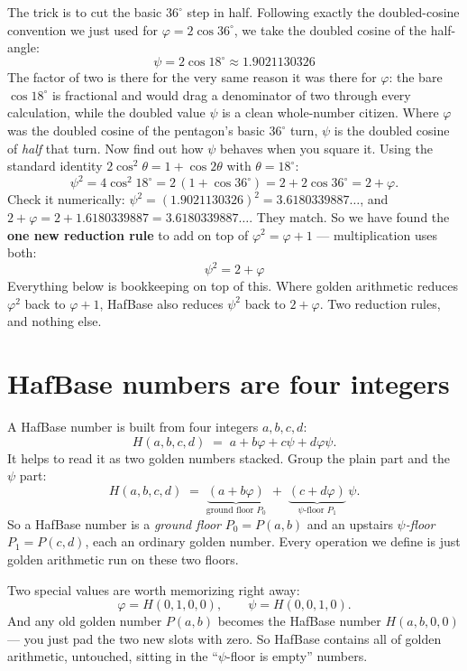\documentclass[11pt]{article}
\newcommand{\phigr}{\varphi}
\newcommand{\Hn}[4]{H(#1,#2,#3,#4)}
\newcommand{\Pn}[2]{P(#1,#2)}
\begin{document}
The trick is to cut the basic $36^\circ$ step in half. Following exactly the doubled-cosine convention
we just used for $\phigr = 2\cos 36^\circ$, we take the doubled cosine of the half-angle:
\[
\boxed{\;\psi = 2\cos 18^\circ \approx 1.9021130326\;}
\]
The factor of two is there for the very same reason it was there for $\phigr$: the bare $\cos 18^\circ$ is
fractional and would drag a denominator of two through every calculation, while the doubled value $\psi$
is a clean whole-number citizen. Where $\phigr$ was the doubled cosine of the pentagon's basic $36^\circ$
turn, $\psi$ is the doubled cosine of \emph{half} that turn. Now find out how $\psi$ behaves when you
square it. Using the standard identity $2\cos^2\theta = 1 + \cos 2\theta$ with $\theta = 18^\circ$:
\[
\psi^2 = 4\cos^2 18^\circ = 2\,(1 + \cos 36^\circ) = 2 + 2\cos 36^\circ = 2 + \phigr.
\]
Check it numerically: $\psi^2 = (1.9021130326)^2 = 3.6180339887\ldots$, and $2 + \phigr = 2 + 1.6180339887 =
3.6180339887\ldots$. They match. So we have found the \textbf{one new reduction rule} to add on top of
$\phigr^2 = \phigr + 1$ --- multiplication uses both:
\[
\boxed{\;\psi^2 = 2 + \phigr\;}
\]
Everything below is bookkeeping on top of this. Where golden arithmetic reduces $\phigr^2$ back to
$\phigr + 1$, HafBase also reduces $\psi^2$ back to $2 + \phigr$. Two reduction rules, and nothing else.

\section{HafBase numbers are four integers}

A HafBase number is built from four integers $a, b, c, d$:
\[
\Hn{a}{b}{c}{d} \;=\; a + b\phigr + c\psi + d\phigr\psi.
\]
It helps to read it as two golden numbers stacked. Group the plain part and the $\psi$ part:
\[
\Hn{a}{b}{c}{d} \;=\; \underbrace{(a + b\phigr)}_{\text{ground floor } P_0} \;+\;
\underbrace{(c + d\phigr)}_{\psi\text{-floor } P_1}\,\psi .
\]
So a HafBase number is a \emph{ground floor} $P_0 = \Pn{a}{b}$ and an upstairs \emph{$\psi$-floor}
$P_1 = \Pn{c}{d}$, each an ordinary golden number. Every operation we define is just golden
arithmetic run on these two floors.

Two special values are worth memorizing right away:
\[
\phigr = \Hn{0}{1}{0}{0}, \qquad \psi = \Hn{0}{0}{1}{0}.
\]
And any old golden number $\Pn{a}{b}$ becomes the HafBase number $\Hn{a}{b}{0}{0}$ --- you just
pad the two new slots with zero. So HafBase contains all of golden arithmetic, untouched, sitting
in the ``$\psi$-floor is empty'' numbers.
\end{document}
